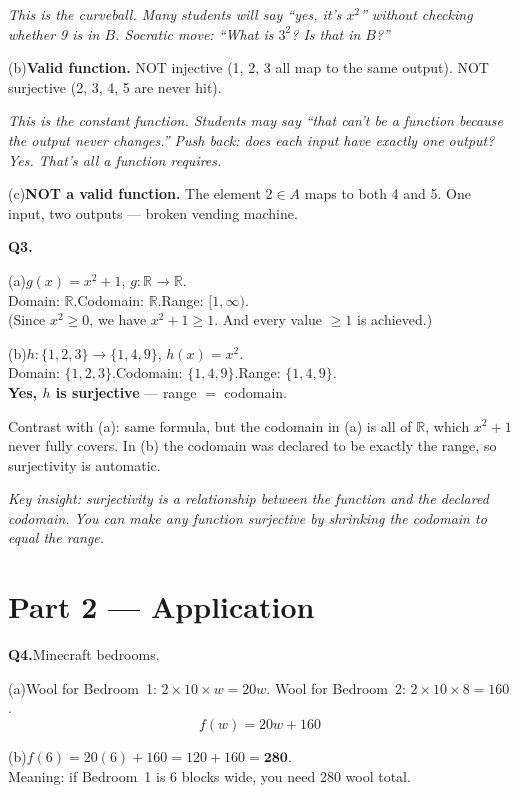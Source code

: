 \documentclass[12pt]{article}
\begin{document}
\textit{This is the curveball. Many students will say ``yes, it's $x^2$'' without
checking whether 9 is in $B$. Socratic move: ``What is $3^2$? Is that in $B$?''}

(b)\quad \textbf{Valid function.} NOT injective (1, 2, 3 all map to the same output).
NOT surjective (2, 3, 4, 5 are never hit).

\textit{This is the constant function. Students may say ``that can't be a function
because the output never changes.'' Push back: does each input have exactly one output? Yes.
That's all a function requires.}

(c)\quad \textbf{NOT a valid function.} The element $2 \in A$ maps to both 4 and 5.
One input, two outputs --- broken vending machine.

\bigskip
\textbf{Q3.}

(a)\quad $g(x) = x^2 + 1$, $g\colon \mathbb{R} \to \mathbb{R}$.\\
Domain: $\mathbb{R}$.\quad Codomain: $\mathbb{R}$.\quad Range: $[1, \infty)$.\\
(Since $x^2 \geq 0$, we have $x^2 + 1 \geq 1$. And every value $\geq 1$ is achieved.)

(b)\quad $h\colon \{1,2,3\} \to \{1,4,9\}$, $h(x) = x^2$.\\
Domain: $\{1,2,3\}$.\quad Codomain: $\{1,4,9\}$.\quad Range: $\{1,4,9\}$.\\
\textbf{Yes, $h$ is surjective} --- range $=$ codomain.

Contrast with (a): same formula, but the codomain in (a) is all of $\mathbb{R}$,
which $x^2 + 1$ never fully covers. In (b) the codomain was declared to be exactly
the range, so surjectivity is automatic.

\textit{Key insight: surjectivity is a relationship between the function and the
declared codomain. You can make any function surjective by shrinking the codomain
to equal the range.}

\section*{Part 2 --- Application}

\textbf{Q4.}\quad Minecraft bedrooms.

(a)\quad Wool for Bedroom~1: $2 \times 10 \times w = 20w$.
Wool for Bedroom~2: $2 \times 10 \times 8 = 160$.
\[
  f(w) = 20w + 160
\]

(b)\quad $f(6) = 20(6) + 160 = 120 + 160 = \mathbf{280}$.\\
Meaning: if Bedroom~1 is 6 blocks wide, you need 280 wool total.
\end{document}
